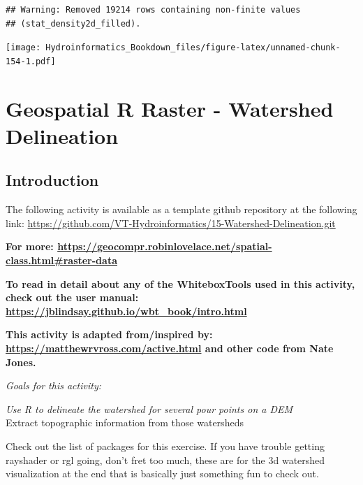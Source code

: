 \documentclass[
]{book}
\newenvironment{Shaded}{\begin{snugshade}}{\end{snugshade}}
\newcommand{\AttributeTok}[1]{\textcolor[rgb]{0.77,0.63,0.00}{#1}}
\newcommand{\CommentTok}[1]{\textcolor[rgb]{0.56,0.35,0.01}{\textit{#1}}}
\newcommand{\FunctionTok}[1]{\textcolor[rgb]{0.00,0.00,0.00}{#1}}
\newcommand{\NormalTok}[1]{#1}
\newcommand{\SpecialCharTok}[1]{\textcolor[rgb]{0.00,0.00,0.00}{#1}}
\begin{document}
\begin{verbatim}
## Warning: Removed 19214 rows containing non-finite values
## (stat_density2d_filled).
\end{verbatim}

\texttt{[image: Hydroinformatics\_Bookdown\_files/figure-latex/unnamed-chunk-154-1.pdf]}

\hypertarget{rgeowatersheds}{%
\chapter{Geospatial R Raster - Watershed Delineation}\label{rgeowatersheds}}

\hypertarget{introduction-4}{%
\section{Introduction}\label{introduction-4}}

The following activity is available as a template github repository at the following link: \url{https://github.com/VT-Hydroinformatics/15-Watershed-Delineation.git}

\textbf{For more: \url{https://geocompr.robinlovelace.net/spatial-class.html\#raster-data}}

\textbf{To read in detail about any of the WhiteboxTools used in this activity, check out the user manual: \url{https://jblindsay.github.io/wbt_book/intro.html}}

\textbf{This activity is adapted from/inspired by: \url{https://matthewrvross.com/active.html} and other code from Nate Jones.}

\emph{Goals for this activity:}

\emph{Use R to delineate the watershed for several pour points on a DEM\\
}Extract topographic information from those watersheds

Check out the list of packages for this exercise. If you have trouble getting rayshader or rgl going, don't fret too much, these are for the 3d watershed visualization at the end that is basically just something fun to check out.

\begin{Shaded}
\end{Shaded}
\end{document}
